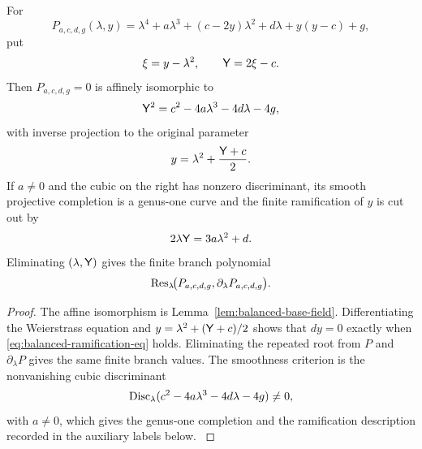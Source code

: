 \begin{proposition}\label{prop:balanced-family}
For
\begin{equation}\label{eq:balanced-family}
P_{a,c,d,g}(\lambda,y)=\lambda^4+a\lambda^3+(c-2y)\lambda^2+d\lambda+y(y-c)+g,
\end{equation}
put
\begin{equation}\label{eq:balanced-xi}
\xi=y-\lambda^2,
\qquad
\mathsf{Y}=2\xi-c.
\end{equation}
Then $P_{a,c,d,g}=0$ is affinely isomorphic to
\begin{equation}\label{eq:balanced-weierstrass}
\mathsf{Y}^2=c^2-4a\lambda^3-4d\lambda-4g,
\end{equation}
with inverse projection to the original parameter
\begin{equation}\label{eq:balanced-inverse}
y=\lambda^2+\frac{\mathsf{Y}+c}{2}.
\end{equation}
If $a\ne0$ and the cubic on the right has nonzero discriminant, its smooth projective completion is a genus-one curve and the finite ramification of $y$ is cut out by
\begin{equation}\label{eq:balanced-ramification-eq}
2\lambda \mathsf{Y}=3a\lambda^2+d.
\end{equation}
Eliminating $(\lambda,\mathsf{Y})$ gives the finite branch polynomial
\begin{equation}\label{eq:balanced-ramification}
\operatorname{Res}_\lambda\!\bigl(P_{a,c,d,g},\partial_\lambda P_{a,c,d,g}\bigr).
\end{equation}
\label{eq:balanced-quintic}
\end{proposition}
\begin{proof}
The affine isomorphism is Lemma~\ref{lem:balanced-base-field}.  Differentiating the Weierstrass equation and $y=\lambda^2+(\mathsf{Y}+c)/2$ shows that $dy=0$ exactly when \eqref{eq:balanced-ramification-eq} holds.  Eliminating the repeated root from $P$ and $\partial_\lambda P$ gives the same finite branch values.  The smoothness criterion is the nonvanishing cubic discriminant
\begin{equation}\label{eq:balanced-genus-condition}
\operatorname{Disc}_\lambda(c^2-4a\lambda^3-4d\lambda-4g)\ne0,
\end{equation}
with $a\ne0$, which gives the genus-one completion and the ramification description recorded in the auxiliary labels below.
\label{cor:balanced-smooth}\label{lem:balanced-projective-completion}\label{cor:balanced-ramification}
\end{proof}

